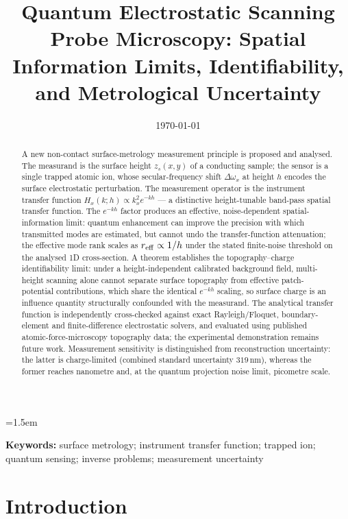 \documentclass[12pt,a4paper]{article}
\title{Quantum Electrostatic Scanning Probe Microscopy: Spatial Information Limits, Identifiability, and Metrological Uncertainty}
\author{}
\date{\today}
\begin{document}
\emergencystretch=1.5em
\maketitle

\begin{abstract}
A new non-contact surface-metrology measurement principle is proposed and
analysed. The measurand is the surface height $z_s(x,y)$ of a conducting
sample; the sensor is a single trapped atomic ion, whose secular-frequency
shift $\Delta\omega_x$ at height $h$ encodes the surface electrostatic
perturbation.  The measurement operator is the instrument transfer
function $H_x(k;h) \propto k_x^2 e^{-kh}$ --- a distinctive
height-tunable band-pass spatial transfer function.  The $e^{-kh}$ factor
produces an effective, noise-dependent spatial-information limit:
quantum enhancement can improve the precision with which transmitted
modes are estimated, but cannot undo the transfer-function attenuation;
the effective mode rank scales as
$r_{\rm eff} \propto 1/h$ under the stated finite-noise threshold on the
analysed 1D cross-section.  A theorem
establishes the topography--charge identifiability limit: under a
height-independent calibrated background field, multi-height scanning
alone cannot separate surface topography from effective patch-potential
contributions, which share the identical $e^{-kh}$ scaling, so surface
charge is an influence quantity structurally confounded with the
measurand.
The analytical transfer function is independently cross-checked against
exact Rayleigh/Floquet, boundary-element and finite-difference
electrostatic solvers, and evaluated using published atomic-force-microscopy
topography data; the experimental demonstration remains future work.
Measurement sensitivity is distinguished from reconstruction uncertainty:
the latter is charge-limited (combined standard uncertainty $319$\,nm),
whereas the former reaches nanometre
and, at the quantum projection noise limit, picometre scale.
\end{abstract}

\noindent\textbf{Keywords:} surface metrology; instrument transfer
function; trapped ion; quantum sensing; inverse problems; measurement
uncertainty

\section{Introduction}
\label{sec:intro}
\end{document}
